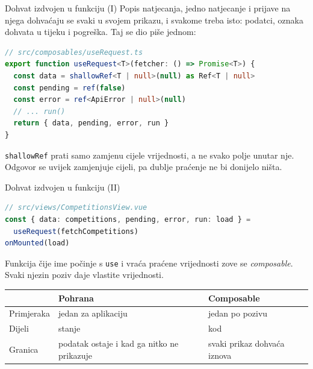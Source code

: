 \begin{frame}[fragile]{Dohvat izdvojen u funkciju (I)}
Popis natjecanja, jedno natjecanje i prijave na njega dohvaćaju se svaki u svojem prikazu, i svakome treba isto: podatci, oznaka dohvata u tijeku i pogreška. Taj se dio piše jednom:

\begin{lstlisting}[language=typescript]
// src/composables/useRequest.ts
export function useRequest<T>(fetcher: () => Promise<T>) {
  const data = shallowRef<T | null>(null) as Ref<T | null>
  const pending = ref(false)
  const error = ref<ApiError | null>(null)
  // ... run()
  return { data, pending, error, run }
}
\end{lstlisting}

\vspace{0.3em}
\texttt{shallowRef} prati samo zamjenu cijele vrijednosti, a ne svako polje unutar nje. Odgovor se uvijek zamjenjuje cijeli, pa dublje praćenje ne bi donijelo ništa.
\end{frame}

\begin{frame}[fragile]{Dohvat izdvojen u funkciju (II)}
\begin{lstlisting}[language=typescript]
// src/views/CompetitionsView.vue
const { data: competitions, pending, error, run: load } =
  useRequest(fetchCompetitions)
onMounted(load)
\end{lstlisting}

\vspace{0.3em}
Funkcija čije ime počinje s \texttt{use} i vraća praćene vrijednosti zove se \emph{composable}. Svaki njezin poziv daje vlastite vrijednosti.

\vspace{0.5em}
\begin{center}
{\small
\setlength{\tabcolsep}{6pt}
\renewcommand{\arraystretch}{1.3}
\begin{tabular}{@{}L{2.6cm}L{3.9cm}L{4.4cm}@{}}
  \toprule
   & \textbf{Pohrana} & \textbf{Composable} \\
  \midrule
  Primjeraka & jedan za aplikaciju & jedan po pozivu \\
  Dijeli & stanje & kod \\
  Granica & podatak ostaje i kad ga nitko ne prikazuje & svaki prikaz dohvaća iznova \\
  \bottomrule
\end{tabular}
}
\end{center}
\end{frame}

